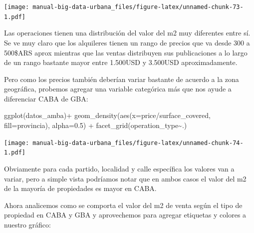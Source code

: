\documentclass[
  spanish,
]{book}
\newenvironment{Shaded}{\begin{snugshade}}{\end{snugshade}}
\newcommand{\AttributeTok}[1]{\textcolor[rgb]{0.77,0.63,0.00}{#1}}
\newcommand{\FloatTok}[1]{\textcolor[rgb]{0.00,0.00,0.81}{#1}}
\newcommand{\FunctionTok}[1]{\textcolor[rgb]{0.00,0.00,0.00}{#1}}
\newcommand{\NormalTok}[1]{#1}
\newcommand{\SpecialCharTok}[1]{\textcolor[rgb]{0.00,0.00,0.00}{#1}}
\begin{document}
\texttt{[image: manual-big-data-urbana\_files/figure-latex/unnamed-chunk-73-1.pdf]}

Las operaciones tienen una distribución del valor del m2 muy diferentes entre sí. Se ve muy claro que los alquileres tienen un rango de precios que va desde 300 a 500\$ARS aprox mientras que las ventas distribuyen sus publicaciones a lo largo de un rango bastante mayor entre 1.500USD y 3.500USD aproximadamente.

Pero como los precios también deberían variar bastante de acuerdo a la zona geográfica, probemos agregar una variable categórica más que nos ayude a diferenciar CABA de GBA:

\begin{Shaded}
\begin{Highlighting}[]
\FunctionTok{ggplot}\NormalTok{(datos\_amba)}\SpecialCharTok{+}
  \FunctionTok{geom\_density}\NormalTok{(}\FunctionTok{aes}\NormalTok{(}\AttributeTok{x=}\NormalTok{price}\SpecialCharTok{/}\NormalTok{surface\_covered, }\AttributeTok{fill=}\NormalTok{provincia), }\AttributeTok{alpha=}\FloatTok{0.5}\NormalTok{) }\SpecialCharTok{+}
  \FunctionTok{facet\_grid}\NormalTok{(operation\_type}\SpecialCharTok{\textasciitilde{}}\NormalTok{.)}
\end{Highlighting}
\end{Shaded}

\texttt{[image: manual-big-data-urbana\_files/figure-latex/unnamed-chunk-74-1.pdf]}

Obviamente para cada partido, localidad y calle específica los valores van a variar, pero a simple vista podríamos notar que en ambos casos el valor del m2 de la mayoría de propiedades es mayor en CABA.

Ahora analicemos como se comporta el valor del m2 de venta según el tipo de propiedad en CABA y GBA y aprovechemos para agregar etiquetas y colores a nuestro gráfico:
\end{document}

